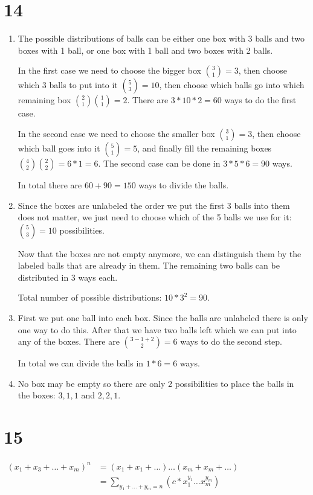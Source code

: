 \documentclass[12pt]{article}
\begin{document}
\section*{14}
\begin{enumerate}[a]
	\item %
	The possible distributions of balls can be either one box with 3 balls and two boxes with 1 ball, or one box with 1 ball and two boxes with 2 balls.

	In the first case we need to choose the bigger box $\binom{3}{1} = 3$, then choose which 3 balls to put into it $\binom{5}{3} = 10$, then choose which balls go into which remaining box $\binom{2}{1} \binom{1}{1} = 2$. There are $3 * 10 * 2 = 60$ ways to do the first case.

	In the second case we need to choose the smaller box $\binom{3}{1} = 3$, then choose which ball goes into it $\binom{5}{1} = 5$, and finally fill the remaining boxes $\binom{4}{2} \binom{2}{2} = 6 * 1 = 6$. The second case can be done in $3 * 5 * 6 = 90$ ways.

	In total there are $60 + 90 = 150$ ways to divide the balls.

	\item %
	Since the boxes are unlabeled the order we put the first 3 balls into them does not matter, we just need to choose which of the 5 balls we use for it: $\binom{5}{3} = 10$ possibilities.

	Now that the boxes are not empty anymore, we can distinguish them by the labeled balls that are already in them. The remaining two balls can be distributed in 3 ways each.

	Total number of possible distributions: $10 * 3^2 = 90$.
	\item %
	First we put one ball into each box. Since the balls are unlabeled there is only one way to do this. After that we have two balls left which we can put into any of the boxes. There are $\binom{3 - 1 + 2}{2} = 6$ ways to do the second step.

	In total we can divide the balls in $1 * 6 = 6$ ways.
	\item %
	No box may be empty so there are only 2 possibilities to place the balls in the boxes: $3, 1, 1$ and $2, 2, 1$.
\end{enumerate}

\section*{15}
$\begin{aligned}
	(x_1 + x_3 + \dots + x_m)^n
	&= (x_1 + x_1 + \dots) \dots (x_m  + x _m + \dots)\\
	&= \sum_{y_1 + \dots + y_m = n} (c * x_1^{y_1} \dots x_m^{y_m})
\end{aligned}$
\end{document}
